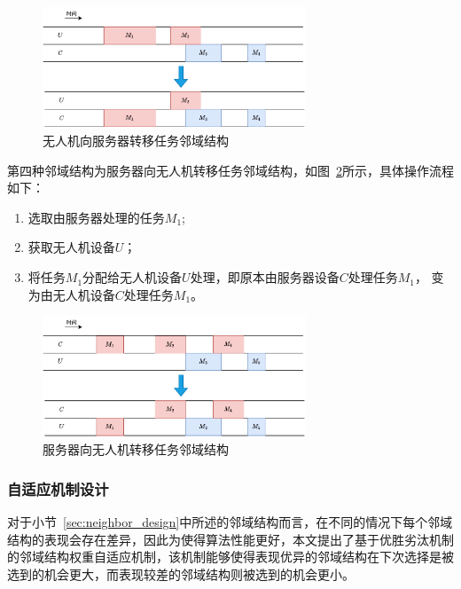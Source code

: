 \begin{figure}[!htbp]
    \centering
    \includegraphics[width=0.7\textwidth]{images/基于边缘计算的任务资源调度算法_无人机向服务器转移任务算子.pdf}
    \caption{无人机向服务器转移任务邻域结构}
    \label{fig:无人机向服务器转移任务邻域结构}
\end{figure}

第四种邻域结构为服务器向无人机转移任务邻域结构，如图~\ref{fig:服务器向无人机转移任务邻域结构}所示，具体操作流程如下：

\begin{enumerate}[label=(\arabic*)]
    \item {选取由服务器处理的任务\(M_1\);}
    \item {获取无人机设备\(U\)；}
    \item {将任务\(M_1\)分配给无人机设备\(U\)处理，即原本由服务器设备\(C\)处理任务\(M_1\)，
    变为由无人机设备\(C\)处理任务\(M_1\)。}
\end{enumerate}

\begin{figure}[!htbp]
    \centering
    \includegraphics[width=0.7\textwidth]{images/基于边缘计算的任务资源调度算法_服务器向无人机转移任务算子.pdf}
    \caption{服务器向无人机转移任务邻域结构}
    \label{fig:服务器向无人机转移任务邻域结构}
\end{figure}

\subsubsection{自适应机制设计}

对于小节~\ref{sec:neighbor_design}中所述的邻域结构而言，在不同的情况下每个邻域结构的表现会存在差异，因此为使得算法性能更好，本文提出了基于优胜劣汰机制的邻域结构权重自适应机制，该机制能够使得表现优异的邻域结构在下次选择是被选到的机会更大，而表现较差的邻域结构则被选到的机会更小。

